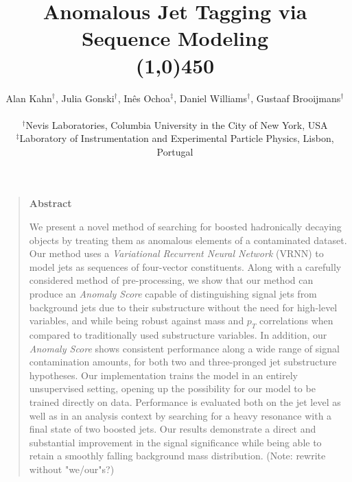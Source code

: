 \documentclass[12pt, a4paper]{article}
\title{\bf{Anomalous Jet Tagging via Sequence Modeling}\\\line(1,0){450}}
\author
{Alan Kahn$^{\dagger}$, Julia Gonski$^{\dagger}$, In\^{e}s Ochoa$^{\ddagger}$, Daniel Williams$^{\dagger}$, Gustaaf Brooijmans$^{\dagger}$\\
\\
\normalsize{$^{\dagger}$Nevis Laboratories, Columbia University in the City of New York, USA}\\
\normalsize{$^{\ddagger}$Laboratory of Instrumentation and Experimental Particle Physics, Lisbon, Portugal}
}
\date{}
\newenvironment{sciabstract}{%
\begin{quote}}
{\end{quote}}
\begin{document}
 



\baselineskip16pt

\maketitle 

\setlength{\abovedisplayskip}{5pt}
\setlength{\belowdisplayskip}{5pt}
\setlength{\abovedisplayshortskip}{0pt}
\setlength{\belowdisplayshortskip}{0pt}



\begin{sciabstract}
  \begin{center}
  {\large\bf{Abstract}\\}
  \end{center}
  
  \vspace{0.4cm}

  We present a novel method of searching for boosted hadronically
  decaying objects by treating them as anomalous elements of
  a contaminated dataset. Our method uses a \textit{Variational Recurrent Neural Network} (VRNN) to model jets as sequences of four-vector constituents. 
  Along with a carefully considered method of pre-processing, we show that our method can produce an \textit{Anomaly Score} capable of distinguishing signal jets from background jets due to their substructure without the need for high-level variables, and while being robust against mass and $p_{T}$ correlations when compared to traditionally used substructure variables. In addition, our \textit{Anomaly Score} shows consistent performance along a wide range of signal contamination amounts, for both two and three-pronged jet substructure hypotheses. Our implementation trains the model in an entirely unsupervised setting, opening up the possibility for our model to be trained directly on data. Performance is evaluated both on the jet level as well as in an analysis context by searching for a heavy resonance with a final state of two boosted jets. Our results demonstrate a direct and substantial improvement in the signal significance while being able to retain a smoothly falling background mass distribution. (Note: rewrite without "we/our"s?)
    
  
\end{sciabstract}


\clearpage

\end{document}
